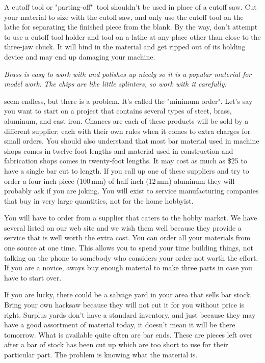 
A cutoff tool or "parting-off"\ tool shouldn't be used in place of a cutoff saw.
Cut your material to size with the cutoff saw, and only use the cutoff tool on
the lathe for separating the finished piece from the blank. By the way, don't
attempt to use a cutoff tool holder and tool on a lathe at any place other than
close to the three-jaw chuck. It will bind in the material and get ripped out of
its holding device and may end up damaging your machine.

\bigskip
\textit{Brass is easy to work with and polishes up nicely so it is a popular
material for model work. The chips are like little splinters, so work with it
carefully.}
\bigskip


seem endless, but there is a problem. It's called the "minimum order". Let's say
you want to start on a project that contains several types of steet, brass,
aluminum, and cast iron. Chances are each of these products will be sold by a
different supplier; each with their own rules when it comes to extra charges for
small orders. You should also understand that most bar material used in machine
shops comes in twelve-foot lengths and material used in construction and
fabrication shops comes in twenty-foot lengths. It may cost as much as \$25 to
have a single bar cut to length. If you call up one of these suppliers and try
to order a four-inch piece (100\,mm) of half-inch (12\,mm) aluminum they will
probably ask if you are joking. You will exist to service manufacturing
companies that buy in very large quantities, not for the home hobbyist.


You will have to order from a supplier that caters to the hobby market. We have
several listed on our web site and we wish them well because they provide a
service that is well worth the extra cost. You can order all your materials from
one source at one time. This allows you to spend your time building things, not
talking on the phone to somebody who considers your order not worth the effort.
If you are a novice, aways buy enough material to make three parts in case you
have to start over.


If you are lucky, there could be a salvage yard in your area that sells bar
stock. Bring your own hacksaw because they will not cut it for you without price
is right. Surplus yards don't have a standard inventory, and just because they
may have a good assortment of material today, it doesn't mean it will be there
tomorrow. What is available quite often are bar ends. These are pieces left over
after a bar of stock has been cut up which are too short to use for their
particular part. The problem is knowing what the material is.

